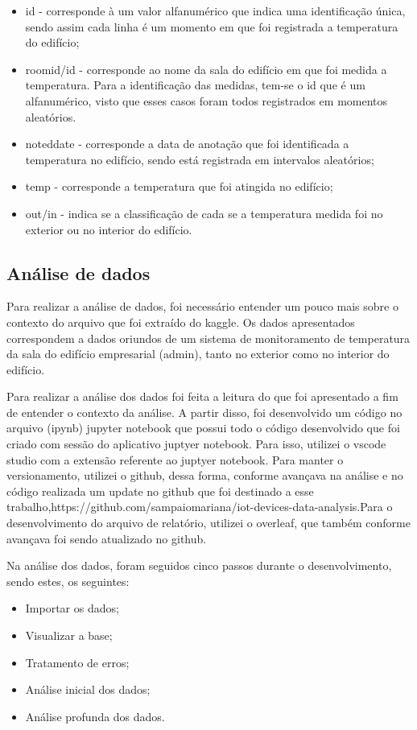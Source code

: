 \documentclass[a4paper, 12pt]{article}
\begin{document}
\begin{itemize}
     \item id - corresponde à um valor alfanumérico que indica uma identificação única, sendo assim cada linha é um momento em que foi registrada a temperatura do edifício;
    \item roomid/id - corresponde ao nome da sala do edifício em que foi medida a temperatura. Para a identificação das medidas, tem-se o id que é um alfanumérico, visto que esses casos foram todos registrados em momentos aleatórios.
    \item noteddate - corresponde a data de anotação que foi identificada a temperatura no edifício, sendo está registrada em intervalos aleatórios;
    \item temp - corresponde a temperatura que foi atingida no edifício;
    \item out/in - indica se a classificação de cada se a temperatura medida foi no exterior ou no interior do edifício.
\end{itemize}


\subsection{Análise de dados}
Para realizar a análise de dados, foi necessário entender um pouco mais sobre o contexto do arquivo que foi extraído do kaggle. Os dados apresentados correspondem a dados oriundos de um sistema de monitoramento de temperatura da sala do edifício empresarial (admin), tanto no exterior como no interior do edifício.

Para realizar a análise dos dados foi feita a leitura do que foi apresentado a fim de entender o contexto da análise. A partir disso, foi desenvolvido um código no arquivo (ipynb) jupyter notebook que possui todo o código desenvolvido que foi criado com sessão do aplicativo juptyer notebook. Para isso, utilizei o vscode studio com a extensão referente ao juptyer notebook. Para manter o versionamento, utilizei o github, dessa forma, conforme avançava na análise e no código realizada um update no github que foi destinado a esse trabalho,https://github.com/sampaiomariana/iot-devices-data-analysis.Para o desenvolvimento do arquivo de relatório, utilizei o overleaf, que também conforme avançava foi sendo atualizado no github.

Na análise dos dados, foram seguidos cinco passos durante o desenvolvimento, sendo estes, os seguintes:
\begin{itemize}
    \item Importar os dados;
    \item Visualizar a base;
    \item Tratamento de erros;
    \item Análise inicial dos dados;
    \item Análise profunda dos dados.
\end{itemize}
\end{document}
